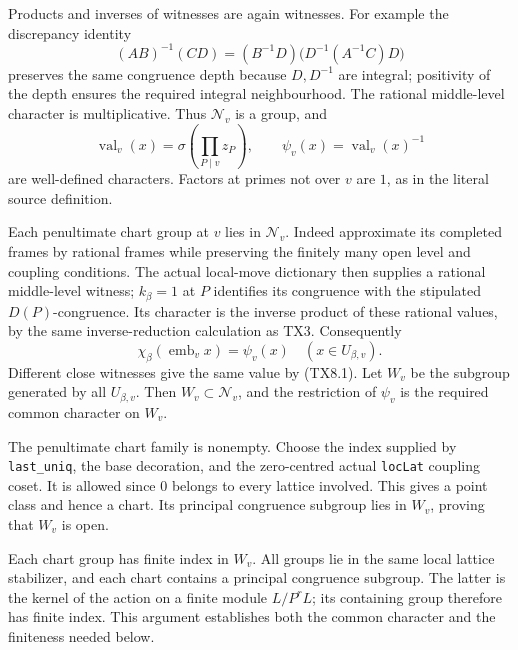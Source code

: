 Products and inverses of witnesses are again witnesses. For
example the discrepancy identity
\[
 (AB)^{-1}(CD)
   =(B^{-1}D)\bigl(D^{-1}(A^{-1}C)D\bigr)
 \tag{TX8.2}
\]
preserves the same congruence depth because \(D,D^{-1}\) are
integral; positivity of the depth ensures the required integral
neighbourhood. The rational middle-level character is
multiplicative. Thus \(\mathcal N_v\) is a group, and
\[
 \operatorname{val}_v(x)
       =\sigma\!\left(\prod_{P\mid v}z_P\right),
 \qquad
 \psi_v(x)=\operatorname{val}_v(x)^{-1}
 \tag{TX8.3}
\]
are well-defined characters. Factors at primes not over \(v\)
are \(1\), as in the literal source definition.

Each penultimate chart group at \(v\) lies in \(\mathcal N_v\).
Indeed approximate its completed frames by rational frames while
preserving the finitely many open level and coupling conditions.
The actual local-move dictionary then supplies a rational
middle-level witness; \(k_\beta=1\) at \(P\) identifies its
congruence with the stipulated \(D(P)\)-congruence. Its character
is the inverse product of these rational values, by the same
inverse-reduction calculation as TX3. Consequently
\[
 \chi_\beta(\operatorname{emb}_v x)=\psi_v(x)
       \quad(x\in U_{\beta,v}).
 \tag{TX8.4}
\]
Different close witnesses give the same value by (TX8.1).
Let \(W_v\) be the subgroup generated by all \(U_{\beta,v}\).
Then \(W_v\subset\mathcal N_v\), and the restriction of \(\psi_v\)
is the required common character on \(W_v\).

The penultimate chart family is nonempty. Choose the index supplied
by \texttt{last\_uniq}, the base decoration, and the zero-centred
actual \texttt{locLat} coupling coset. It is allowed since
\(0\) belongs to every lattice involved. This gives a point class
and hence a chart. Its principal congruence subgroup lies in
\(W_v\), proving that \(W_v\) is open.

Each chart group has finite index in \(W_v\). All groups lie
in the same local lattice stabilizer, and each chart contains a
principal congruence subgroup. The latter is the kernel of the
action on a finite module \(L/P^rL\); its containing group
therefore has finite index. This argument establishes both the
common character and the finiteness needed below.

